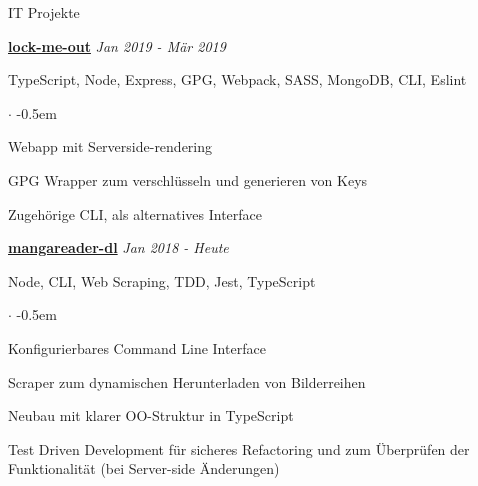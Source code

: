 \documentclass{cv}
\begin{document}
\begin{rSection}{IT Projekte}




  \textbf{\href{https://github.com/jneidel/lock-me-out}{lock-me-out}}
  \hfill
  {\em Jan 2019 - Mär 2019}

  TypeScript, Node, Express, GPG, Webpack, SASS, MongoDB, CLI, Eslint
  \begin{list}{$\cdot$}{}
    \itemsep -0.5em \vspace{-0.5em}
    \smallskip
    \item Webapp mit Serverside-rendering
    \item GPG Wrapper zum verschlüsseln und generieren von Keys
    \item Zugehörige CLI, als alternatives Interface
  \end{list}

  \textbf{\href{https://github.com/jneidel/mangareader-dl}{mangareader-dl}}
  \hfill
  {\em Jan 2018 - Heute}

  Node, CLI, Web Scraping, TDD, Jest, TypeScript
  \begin{list}{$\cdot$}{}
    \itemsep -0.5em \vspace{-0.5em}
    \smallskip
    \item Konfigurierbares Command Line Interface
    \item Scraper zum dynamischen Herunterladen von Bilderreihen
    \item Neubau mit klarer OO-Struktur in TypeScript
    \item Test Driven Development für sicheres Refactoring und zum Überprüfen der
  Funktionalität (bei Server-side Änderungen)
  \end{list}


\end{rSection}
\end{document}
